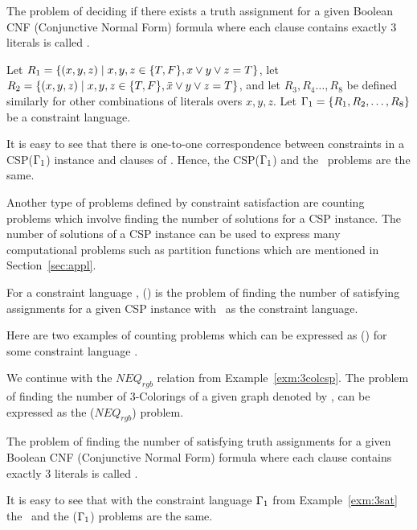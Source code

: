 \begin{example}[\tsat]\label{exm:3sat}
The problem of deciding if there exists a truth assignment for a 
given Boolean CNF (Conjunctive Normal Form) formula where each
clause contains exactly 3 literals is called \tsat\@.

Let \(R_1=\{(x,y,z)\mid x,y,z\in \{{T,F}\}, x\lor y\lor z = T\}\), 
let \(R_2=\{(x,y,z)\mid x,y,z\in \{{T,F}\}, \bar x\lor y\lor z = T\}\), 
and let \(R_3,R_4\dotsc,R_8\) be defined similarly for other combinations of literals overs
\(x,y,z\)\@. Let \(\Gamma_1=\{{R_1,R_2,\dotsc, R_8}\}\) be a constraint language.

It is easy to see that there is one-to-one correspondence between constraints 
in a CSP(\(\Gamma_1\)) instance and clauses of \tsat\@. Hence,
the CSP(\(\Gamma_1\)) and the \tsat\ problems are the same.
\end{example}


Another type of problems defined by constraint satisfaction are
counting problems which involve finding the number of solutions for a CSP instance.
The number of solutions of a CSP instance can be used to express many computational problems
such as partition functions which are mentioned in Section~\ref{sec:appl}.

\begin{defi}[\ccsp(\mrelset)] 
For a constraint language \mrelset,
\ccsp(\mrelset) is the problem of finding the number of satisfying assignments for a
given CSP instance with \mrelset\ as the constraint language.
\end{defi}

Here are two examples of counting problems which can be expressed as \ccsp(\mrelset) for some
constraint language \mrelset\@.
\begin{example}[\ctcol]
We continue with the \(NEQ_{rgb}\) relation from Example~\ref{exm:3colcsp}\@.
The problem of finding the number of 3-Colorings of a given graph denoted by 
\ctcol, can be expressed as the \ccsp(\(NEQ_{rgb}\)) problem.
\end{example}

\begin{example}\label{exm:c3sat}
The problem of finding the number of satisfying truth assignments for a given 
Boolean CNF (Conjunctive Normal Form) formula where each clause contains exactly 3 literals
is called \ctsat\@. 

It is easy to see that with the constraint language \(\Gamma_1\) from Example~\ref{exm:3sat}
the \ctsat\ and the \ccsp(\(\Gamma_1\)) problems are the same.
\end{example} 
